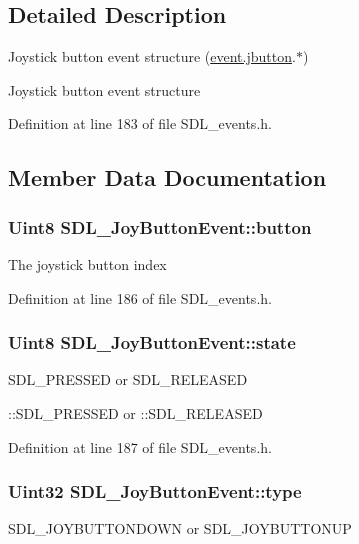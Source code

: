 \subsection{Detailed Description}
Joystick button event structure (\hyperlink{unionSDL__Event_a591104d64903ae1cf70874fb5d3124ff}{event.\+jbutton}.$\ast$) 

Joystick button event structure 

Definition at line 183 of file S\+D\+L\+\_\+events.\+h.



\subsection{Member Data Documentation}
\hypertarget{structSDL__JoyButtonEvent_a73ebe4261cf80564052af9c1af737a4d}{
\subsubsection[{button}]{\setlength{\rightskip}{0pt plus 5cm}Uint8 S\+D\+L\+\_\+\+Joy\+Button\+Event\+::button}}\label{structSDL__JoyButtonEvent_a73ebe4261cf80564052af9c1af737a4d}
The joystick button index 

Definition at line 186 of file S\+D\+L\+\_\+events.\+h.

\hypertarget{structSDL__JoyButtonEvent_ad3b6f8d9aa2c5e694f664b97d12bcd2b}{
\subsubsection[{state}]{\setlength{\rightskip}{0pt plus 5cm}Uint8 S\+D\+L\+\_\+\+Joy\+Button\+Event\+::state}}\label{structSDL__JoyButtonEvent_ad3b6f8d9aa2c5e694f664b97d12bcd2b}
S\+D\+L\+\_\+\+P\+R\+E\+S\+S\+E\+D or S\+D\+L\+\_\+\+R\+E\+L\+E\+A\+S\+E\+D

\+::\+S\+D\+L\+\_\+\+P\+R\+E\+S\+S\+E\+D or \+::\+S\+D\+L\+\_\+\+R\+E\+L\+E\+A\+S\+E\+D 

Definition at line 187 of file S\+D\+L\+\_\+events.\+h.

\hypertarget{structSDL__JoyButtonEvent_a8f3312a046d37fa2884b93f69c4cb655}{
\subsubsection[{type}]{\setlength{\rightskip}{0pt plus 5cm}Uint32 S\+D\+L\+\_\+\+Joy\+Button\+Event\+::type}}\label{structSDL__JoyButtonEvent_a8f3312a046d37fa2884b93f69c4cb655}
S\+D\+L\+\_\+\+J\+O\+Y\+B\+U\+T\+T\+O\+N\+D\+O\+W\+N or S\+D\+L\+\_\+\+J\+O\+Y\+B\+U\+T\+T\+O\+N\+U\+P

